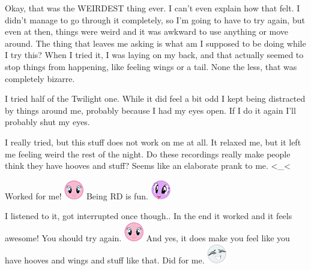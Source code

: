 \documentclass[ebook,12pt,oneside,openany]{memoir}
\newcommand{\mytexttilde}{\raisebox{0.5ex}{\texttildelow}}
\begin{document}
\begin{tcolorbox}[title=Gcdm]
\par{Okay, that was the WEIRDEST thing ever. I can't even explain how that felt. I didn't manage to go through it completely, so I'm going to have to try again, but even at then, things were weird and it was awkward to use anything or move around. The thing that leaves me asking is what am I supposed to be doing while I try this? When I tried it, I was laying on my back, and that actually seemed to stop things from happening, like feeling wings or a tail. None the less, that was completely bizarre.}
\end{tcolorbox}
\begin{tcolorbox}[title=\mytexttilde{}Chaotic Eddie\mytexttilde{}]
\par{I tried half of the Twilight one. While it did feel a bit odd I kept being distracted by things around me, probably because I had my eyes open. If I do it again I'll probably shut my eyes.}
\end{tcolorbox}
\begin{tcolorbox}[title=AutisticBrony]
\begin{tcolorbox}[title=TailsIsNotAlone]
\par{I really tried, but this stuff does not work on me at all. It relaxed me, but it left me feeling weird the rest of the night. Do these recordings really make people think they have hooves and stuff? Seems like an elaborate prank to me. <\_<}
\end{tcolorbox}
\par{Worked for me! \includegraphics{images/mlp_smile.png} Being RD is fun. \includegraphics{images/mlp_eW9KEfP.png}}
\par{I listened to it, got interrupted once though.. In the end it worked and it feels awesome! You should try again. \includegraphics{images/mlp_smile.png} And yes, it does make you feel like you have hooves and wings and stuff like that. Did for me. \includegraphics{images/mlp_8pfRZzv.png}}
\end{tcolorbox}
\end{document}
